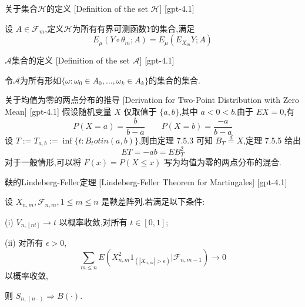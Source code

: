 \documentclass[UTF8]{ctexart}
\begin{document}
    
    
    \begin{dfn}
        {关于集合$\mathcal{H}$的定义}
        [Definition of the set $\mathcal{H}$]
        [gpt-4.1]
        
设 $A \in \mathcal{F}_m$,定义$\mathcal{H}$为所有有界可测函数$Y$的集合,满足
\[
E _ { \mu } ( Y \circ \theta _ { m } ; A ) = E _ { \mu } ( E _ { X _ { m } } Y ; A )
\]

    \end{dfn}
    
    
    
    \begin{dfn}
        {$\mathcal{A}$集合的定义}
        [Definition of the set $\mathcal{A}$]
        [gpt-4.1]
        
令$\mathcal{A}$为所有形如$\{\omega : \omega_0 \in A_0, \ldots, \omega_k \in A_k\}$的集合的集合.

    \end{dfn}
    
    
    
    \begin{prf}
        {关于均值为零的两点分布的推导}
        [Derivation for Two-Point Distribution with Zero Mean]
        [gpt-4.1]
        假设随机变量 $X$ 仅取值于 $\{a, b\}$,其中 $a < 0 < b$.由于 $E X = 0$,有
\[
P(X = a) = \frac{b}{b-a} \qquad P(X = b) = \frac{-a}{b-a}
\]
设 $T := T_{a, b} := \inf\{t : B_t 
otin (a, b)\}$,则由定理 7.5.3 可知 $B_T \overset{d}{=} X$,定理 7.5.5 给出
\[
E T = -a b = E B_T^2
\]
对于一般情形,可以将 $F(x) = P(X \leq x)$ 写为均值为零的两点分布的混合.

    \end{prf}
    
    
    
    \begin{thm}
        {鞅的Lindeberg-Feller定理}
        [Lindeberg-Feller Theorem for Martingales]
        [gpt-4.1]
        
设 $X_{n, m}, \mathcal{F}_{n, m}, 1 \leq m \leq n$ 是鞅差阵列.若满足以下条件:

(i) $V_{n, [nt]} \to t$ 以概率收敛,对所有 $t \in [0, 1]$;

(ii) 对所有 $\epsilon > 0$,
\[
\sum_{m \leq n} E(X_{n, m}^2 1_{( |X_{n, m}| > \epsilon )} | \mathcal{F}_{n, m-1}) \to 0
\]
以概率收敛,

则 $S_{n, (n \cdot)} \Rightarrow B(\cdot)$.

    \end{thm}
    
\end{document}
